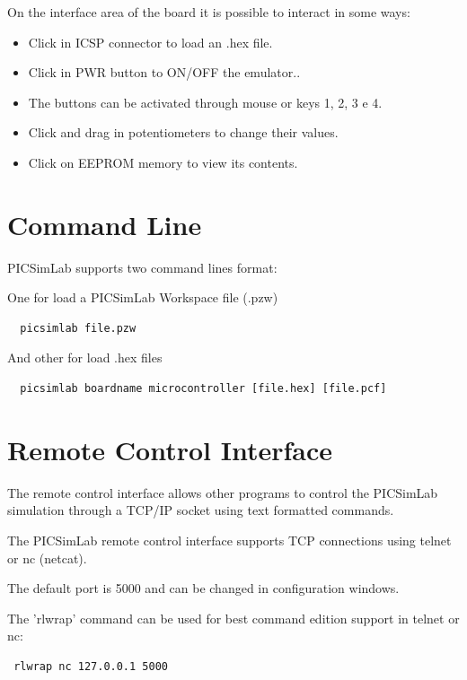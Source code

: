 On the interface area of the board it is possible to interact in some ways:

\begin{itemize}
 \item Click in ICSP connector to load an .hex file.
 \item Click in PWR button to ON/OFF the emulator..
 \item The buttons can be activated through mouse or keys 1, 2, 3 e 4.
 \item Click and drag in potentiometers to change their values.
 \item Click on EEPROM memory to view its contents.
\end{itemize}


\section{Command Line}

PICSimLab supports two command lines format:

One for load a PICSimLab Workspace file (.pzw) 
\begin{verbatim}
  picsimlab file.pzw
\end{verbatim}

And other for load .hex files
\begin{verbatim}
  picsimlab boardname microcontroller [file.hex] [file.pcf]
\end{verbatim}


\section{Remote Control Interface}\hypertarget{def:rcontrol}{}

The remote control interface allows other programs to control the PICSimLab simulation
through a TCP/IP socket using text formatted commands. 

The PICSimLab remote control interface supports TCP connections using telnet or nc (netcat).

The default port is 5000 and can be changed in configuration windows. 

The 'rlwrap' command can be used for best command edition support in telnet or nc:
\begin{verbatim}
 rlwrap nc 127.0.0.1 5000
\end{verbatim}
  
